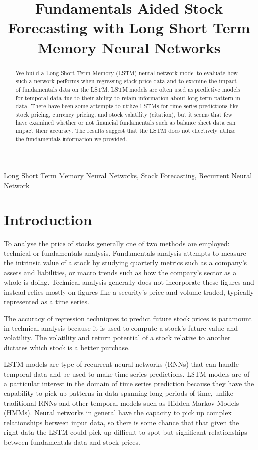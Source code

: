\documentclass{article}
\title{Fundamentals Aided Stock Forecasting with Long Short Term Memory Neural Networks}
\begin{document}
%
\maketitle
%
\begin{abstract}
We build a Long Short Term Memory (LSTM) neural network model to evaluate how such a network performs when regressing stock price data and to examine the impact of fundamentals data on the LSTM. LSTM models are often used as predictive models for temporal data due to their ability to retain information about long term pattern in data. There have been some attempts to utilize LSTMs for time series predictions like stock pricing, currency pricing, and stock volatility (citation), but it seems that few have examined whether or not financial fundamentals such as balance sheet data can impact their accuracy. The results suggest that the LSTM does not effectively utilize the fundamentals information we provided.
\end{abstract}
%
\begin{keywords}
Long Short Term Memory Neural Networks, Stock Forecasting, Recurrent Neural Network
\end{keywords}
%
\section{Introduction}
\label{sec:intro}

To analyse the price of stocks generally one of two methods are employed: technical or fundamentals analysis. Fundamentals analysis attempts to measure the intrinsic value of a stock by studying quarterly metrics such as a company’s assets and liabilities, or macro trends such as how the company’s sector as a whole is doing.  Technical analysis generally does not incorporate these figures and instead relies mostly on figures like a security’s price and volume traded, typically represented as a time series. 

The accuracy of regression techniques to predict future stock prices is paramount in technical analysis because it is used to compute a stock's future value and volatility. The volatility and return potential of a stock relative to another dictates which stock is a better purchase.

LSTM models are type of recurrent neural networks (RNNs) that can handle temporal data and be used to make time series predictions. LSTM models are of a particular interest in the domain of time series prediction because they have the capability to pick up patterns in data spanning long periods of time, unlike traditional RNNs and other temporal models such as Hidden Markov Models (HMMs). Neural networks in general have the capacity to pick up complex relationships between input data, so there is some chance that that given the right data the LSTM could pick up difficult-to-spot but significant relationships between fundamentals data and stock prices.  
\end{document}
